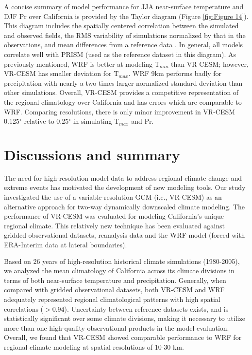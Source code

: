 \documentclass[draft,ms]{agutex}   %
\begin{document}
\begin{article}
A concise summary of model performance for JJA near-surface temperature and DJF Pr over California is provided by the Taylor diagram (Figure \ref{fig:Figure 14}). This diagram includes the spatially centered correlation between the simulated and observed fields, the RMS variability of simulations normalized by that in the observations, and mean differences from a reference data \citep{taylor2001summarizing}. In general, all models correlate well with PRISM (used as the reference dataset in this diagram). As previously mentioned, WRF is better at modeling T$_{min}$ than VR-CESM; however, VR-CESM has smaller deviation for T$_{max}$. WRF 9km performs badly for precipitation with nearly a two times larger normalized standard deviation than other simulations. Overall, VR-CESM provides a competitive representation of the regional climatology over California and has errors which are comparable to WRF. Comparing resolutions, there is only minor improvement in VR-CESM 0.125$^\circ$ relative to 0.25$^\circ$ in simulating T$_{max}$ and Pr.

\section{Discussions and summary}

The need for high-resolution model data to address regional climate change and extreme events has motivated the development of new modeling tools.  Our study investigated the use of a variable-resolution GCM (i.e., VR-CESM) as an alternative approach for two-way dynamically downscaled climate modeling. The performance of VR-CESM was evaluated for modeling California's unique regional climate. This relatively new technique has been evaluated against gridded observational datasets, reanalysis data and the WRF model (forced with ERA-Interim data at lateral boundaries).


Based on 26 years of high-resolution historical climate simulations (1980-2005), we analyzed the mean climatology of California across its climate divisions in terms of both near-surface temperature and precipitation. Generally, when compared with gridded observational datasets, both VR-CESM and WRF adequately represented regional climatological patterns with high spatial correlations ($>$0.94). Uncertainty between reference datasets exists, and is statistically significant over some climate divisions, making it necessary to utilize more than one high-quality observational products in the model evaluation. Overall, we found that VR-CESM showed comparable performance to WRF for regional climate modeling at spatial resolutions of 10-30 km.



\end{article}
\end{document}
